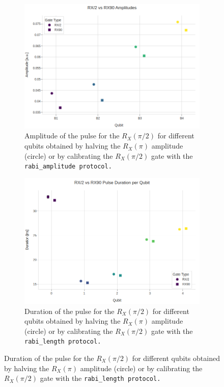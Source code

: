 \begin{figure}[h!]
    \centering
    \begin{subfigure}[t]{0.3\textwidth}
        \includegraphics[width=\textwidth]{figures/png/RX90/rabi_amplitude.png}
        \caption{Amplitude of the pulse for the $R_X(\pi/2)$ for different qubits obtained by halving the $R_X(\pi)$ amplitude (circle) or by calibrating the $R_X(\pi/2)$ gate with the \tt{rabi\_amplitude} protocol.}
        \label{fig:RX90_amplitude}
    \end{subfigure}
    \hfill
    \begin{subfigure}[t]{0.3\textwidth}
        \includegraphics[width=\textwidth]{figures/png/RX90/rabi_length.png}
        \caption{Duration of the pulse for the $R_X(\pi/2)$ for different qubits obtained by halving the $R_X(\pi)$ amplitude (circle) or by calibrating the $R_X(\pi/2)$ gate with the \tt{rabi\_length} protocol.}

\end{subfigure}
\end{figure}
